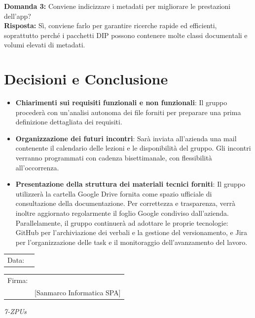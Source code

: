 \documentclass[a4paper,12pt]{article}
\begin{document}
\textbf{Domanda 3:} Conviene indicizzare i metadati per migliorare le prestazioni dell’app? \\[0.5em]
\textbf{Risposta:} Sì, conviene farlo per garantire ricerche rapide ed efficienti, soprattutto perché i pacchetti DIP possono contenere molte classi documentali e volumi elevati di metadati.

\vspace{0.5cm}

\section{Decisioni e Conclusione}
\begin{itemize}
    \item \textbf{Chiarimenti sui requisiti funzionali e non funzionali}: 
    Il gruppo procederà con un’analisi autonoma dei file forniti per preparare una prima definizione dettagliata dei requisiti.
    \item \textbf{Organizzazione dei futuri incontri}: 
    Sarà inviata all’azienda una mail contenente il calendario delle lezioni e le disponibilità del gruppo. Gli incontri verranno programmati con cadenza bisettimanale, con flessibilità all’occorrenza.
    \item \textbf{Presentazione della struttura dei materiali tecnici forniti}: Il gruppo utilizzerà la cartella Google Drive fornita come spazio ufficiale di consultazione della documentazione. Per correttezza e trasparenza, verrà inoltre aggiornato regolarmente il foglio Google condiviso dall’azienda. Parallelamente, il gruppo continuerà ad adottare le proprie tecnologie: GitHub per l’archiviazione dei verbali e la gestione del versionamento, e Jira per l’organizzazione delle task e il monitoraggio dell’avanzamento del lavoro.
    
\end{itemize}

\vfill


\begin{flushleft}
\begin{tabular}{@{}p{0.5in}p{2in}@{}}
Data: & \hrulefill \\
\end{tabular}

\vspace{1em}

\begin{tabular}{@{}p{0.5in}p{2in}@{}}
Firma: & \hrulefill \\
& [Sanmarco Informatica SPA] \\
\end{tabular}
\end{flushleft}

\begin{flushright}
    \textit{7-ZPUs}
\end{flushright}
\end{document}
